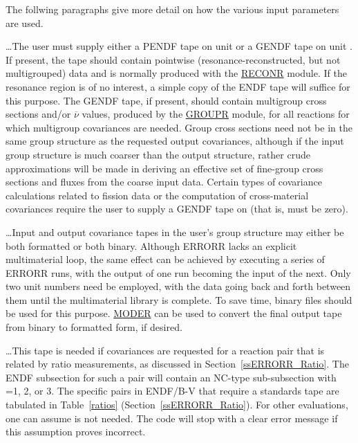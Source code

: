 The follwing paragraphs give more detail on how the various
input parameters are used.

 \ldots\hspace{.1in}The user must supply either a
PENDF tape on unit  or a GENDF
tape on unit .  If present, the  tape should
contain pointwise (resonance-reconstructed, but not multigrouped) data
and is normally produced with the
\hyperlink{sRECONRhy}{RECONR} module.  If the
resonance region is of no interest, a simple copy of the ENDF tape will
suffice for this purpose.  The GENDF tape, if present, should contain
multigroup cross sections and/or $\overline{\nu}$ values, produced by
the \hyperlink{sGROUPRhy}{GROUPR} module,
for all reactions for which multigroup
covariances are needed.  Group cross sections need not be in the same group
structure as the requested output covariances, although if the input
group structure is much coarser than the output structure, rather crude
approximations will be made in deriving an effective set of fine-group
cross sections and fluxes from the coarse input data.  Certain types
of covariance calculations related to fission data or the computation
of cross-material covariances require the user to supply a GENDF
tape on  (that is,  must be zero).

 \ldots\hspace{.1in}Input and output covariance
tapes in the user's group structure may either be both formatted or
both binary.  Although ERRORR lacks an explicit multimaterial
loop, the same effect can be achieved by executing a series of ERRORR
runs, with the output of one run becoming the input of the next.  Only
two unit numbers need be employed, with the data going back and forth
between them until the multimaterial library is complete.  To save
time, binary files should be used for this
purpose.  \hyperlink{sMODERhy}{MODER}
can be used to convert the final output tape from binary to formatted
form, if desired.

 \ldots\hspace{.1in}This tape is needed if covariances
are requested for a reaction pair that is related by ratio
measurements, as discussed in Section~\ref{ssERRORR_Ratio}.  The ENDF
subsection for
such a pair will contain an NC-type sub-subsection with
=1, 2, or 3.  The specific pairs in ENDF/B-V that require
a standards tape are tabulated  in Table~\ref{ratios}
(Section~\ref{ssERRORR_Ratio}).
For other evaluations, one can assume  is not needed.
The code will stop with a clear error message if this assumption
proves incorrect.

